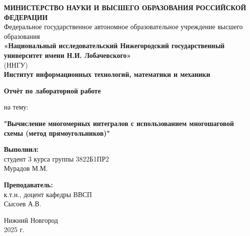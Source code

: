 \documentclass[12pt,a4paper]{extarticle}
\begin{document}
\begin{titlepage}
\begin{center}

\onehalfspacing

\begin{center}
    \textbf{МИНИСТЕРСТВО НАУКИ И ВЫСШЕГО ОБРАЗОВАНИЯ РОССИЙСКОЙ ФЕДЕРАЦИИ} \\ 			
    \vspace{0.5cm}
    Федеральное государственное автономное образовательное учреждение высшего образования \\ 
    \vspace{0.5cm}
    \textbf{«Национальный исследовательский Нижегородский государственный университет имени Н.И. Лобачевского»} \\
    (ННГУ)\\
    \vspace{0.5cm}
    \textbf{Институт информационных технологий, математики и механики}
\end{center}
\vspace{2.5cm}
\begin{center}
    \textbf{Отчёт по лабораторной работе}

    на тему: 

    \textbf{"Вычисление многомерных интегралов с использованием многошаговой схемы (метод прямоугольников)"}
\end{center}

\vspace{2.5cm}

\begin{flushright}
    \textbf{Выполнил:} \\
    студент 3 курса группы 3822Б1ПР2 \\
    Мурадов М.М. \\

    \vspace{1cm}

\noindent\textbf{Преподаватель:} \\
к.т.н., доцент кафедры ВВСП \\
{Сысоев А.В.}
\end{flushright}

\vspace{2em}

\vfill

\begin{center}
    Нижний Новгород \\
    2025 г.
\end{center}

\end{center}
\end{titlepage}
\end{document}
